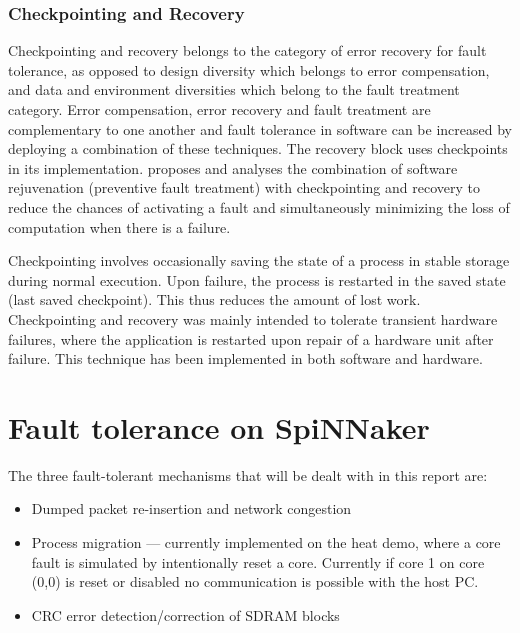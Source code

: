 \documentclass[a4paper, 11pt]{article}
\begin{document}

\subsubsection{Checkpointing and Recovery}
Checkpointing and recovery \citep{kulkarni1990effects} belongs to the category of error recovery for fault tolerance, as opposed to design diversity which belongs to error compensation, and data and environment diversities which belong to the fault treatment category. Error compensation, error recovery and fault treatment are complementary to one another and fault tolerance in software can be increased by deploying a combination of these techniques. The recovery block uses checkpoints in its implementation. \citet{garg1996minimizing} proposes and analyses the combination of software rejuvenation (preventive fault treatment) with checkpointing and recovery to reduce the chances of activating a fault and simultaneously minimizing the loss of computation when there is a failure.

Checkpointing involves occasionally saving the state of a process in stable storage during normal execution. Upon failure, the process is restarted in the saved state (last saved checkpoint). This thus reduces the amount of lost work. Checkpointing and recovery was mainly intended to tolerate transient hardware failures, where the application is restarted upon repair of a hardware unit after failure. This technique has been implemented in both software and hardware.


\section{Fault tolerance on SpiNNaker}
The three fault-tolerant mechanisms that will be dealt with in this report are:
\begin{itemize}
\item Dumped packet re-insertion and network congestion
\item Process migration --- currently implemented on the heat demo, where a core fault is simulated by intentionally reset a core. Currently if core 1 on core (0,0) is reset or disabled no communication is possible with the host PC.
\item CRC error detection/correction of SDRAM blocks
\end{itemize}
\end{document}
